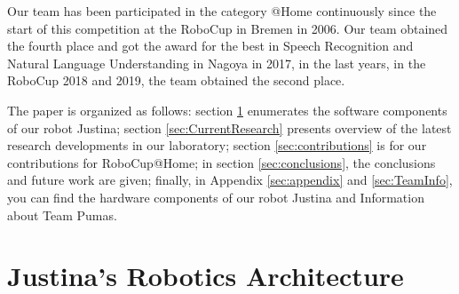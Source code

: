 \documentclass{llncs}
\begin{document}
Our team has been participated in the category @Home continuously since the start of this competition at the RoboCup in Bremen in 2006. Our team obtained the  fourth place and got the award for the best in Speech Recognition and Natural Language Understanding in Nagoya in 2017, in the last years, in the RoboCup 2018 and 2019, the team obtained the second place.

The paper is organized as follows:
section \ref{sec:background} enumerates the software components of our robot
Justina; section \ref{sec:CurrentResearch}  presents overview of the latest research developments in our
laboratory; section \ref{sec:contributions} is for our contributions for RoboCup@Home;
in section \ref{sec:conclusions}, the conclusions and future work are given;
finally, in Appendix \ref{sec:appendix} and \ref{sec:TeamInfo}, you can find the hardware components of our robot Justina 
and Information about Team Pumas.


\section{Justina's Robotics Architecture}\label{sec:background}





\end{document}
